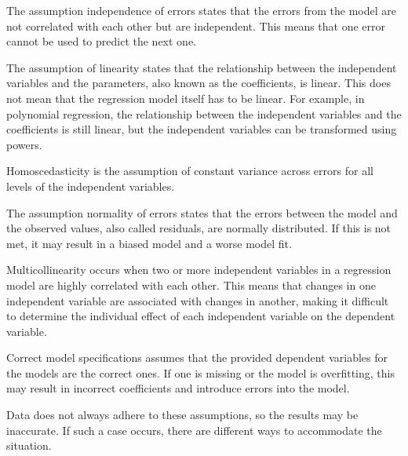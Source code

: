    \newline

The assumption independence of errors states that the errors from the model are not correlated with each other but are independent. This means that one error cannot be used to predict the next one. \newline


 The assumption of linearity states that the relationship between the independent variables and the parameters, also known as the coefficients, is linear. This does not mean that the regression model itself has to be linear. For example, in polynomial regression, the relationship between the independent variables and the coefficients is still linear, but the independent variables can be transformed using powers.\newline


Homoscedasticity is the assumption of constant variance across errors for all levels of the independent variables. \newline

The assumption normality of errors states that the errors between the model and the observed values, also called residuals, are normally distributed. If this is not met, it may result in a biased model and a worse model fit. \newline


Multicollinearity occurs when two or more independent variables in a regression model are highly correlated with each other. This means that changes in one independent variable are associated with changes in another, making it difficult to determine the individual effect of each independent variable on the dependent variable. \newline

Correct model specifications assumes that the provided dependent variables for the models are the correct ones. If one is missing or the model is overfitting, this may result in incorrect coefficients and introduce errors into the model. \newline

Data does not always adhere to these assumptions, so the results may be inaccurate. 
If such a case occurs, there are different ways to accommodate the situation.  


